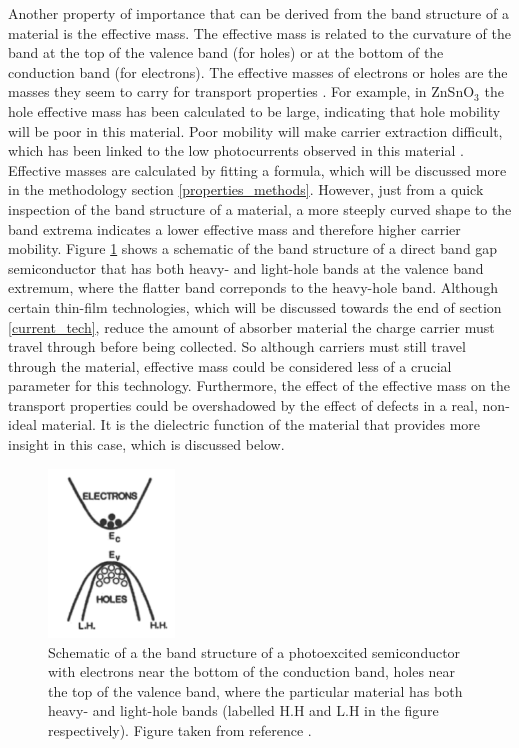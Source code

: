 Another property of importance that can be derived from the band structure of a material is the effective mass. The effective mass is related to the curvature of the band at the top of the valence band (for holes) or at the bottom of the conduction band (for electrons). The effective masses of electrons or holes are the masses they seem to carry for transport properties \cite{dielectric_const1}. For example, in ZnSnO$_3$ the hole effective mass has been calculated to be large, indicating that hole mobility will be poor in this material. Poor mobility will make carrier extraction difficult, which has been linked to the low photocurrents observed in this material \cite{effective_mass1}. Effective masses are calculated by fitting a formula, which will be discussed more in the methodology section \ref{properties_methods}. However, just from a quick inspection of the band structure of a material, a more steeply curved shape to the band extrema indicates a lower effective mass and therefore higher carrier mobility. Figure \ref{heavy_holes} shows a schematic of the band structure of a direct band gap semiconductor that has both heavy- and light-hole bands at the valence band extremum, where the flatter band correponds to the heavy-hole band.
Although certain thin-film technologies, which will be discussed towards the end of section \ref{current_tech}, reduce the amount of absorber material the charge carrier must travel through before being collected. So although carriers must still travel through the material, effective mass could be considered less of a crucial parameter for this technology. Furthermore, the effect of the effective mass on the transport properties could be overshadowed by the effect of defects in a real, non-ideal material. It is the dielectric function of the material that provides more insight in this case, which is discussed below.

\begin{figure}[h!]
  \centering
    \includegraphics[width=0.3\textwidth]{figures/heavy_holes.png}
    \caption{Schematic of a the band structure of a photoexcited semiconductor with electrons near the bottom of the conduction band, holes near the top of the valence band, where the particular material has both heavy- and light-hole bands (labelled H.H and L.H in the figure respectively). Figure taken from reference .}
  \label{heavy_holes}
\end{figure}

